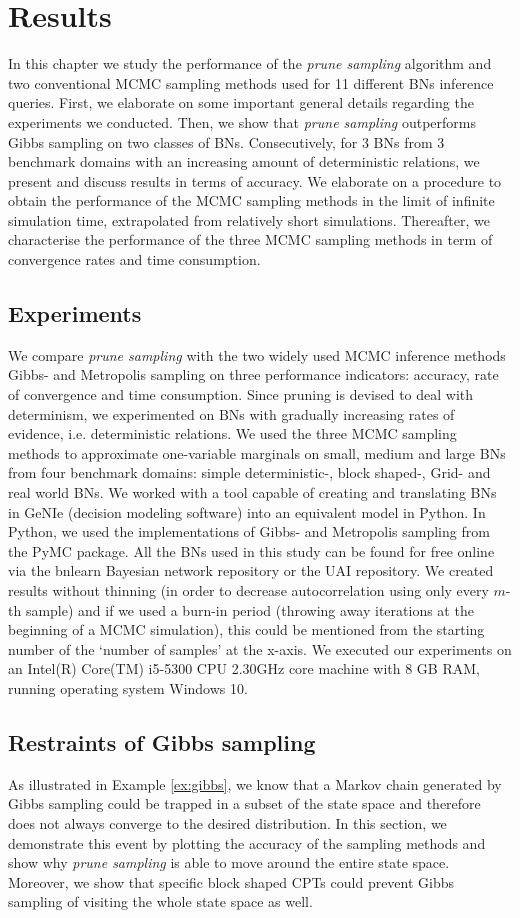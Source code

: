 \documentclass[a4paper, twoside, 11pt]{report}
\theoremstyle{plain}
\theoremstyle{definition}
\theoremstyle{remark}
\newcommand{\ps}{\textit{prune sampling }}
\begin{document}
\chapter{Results}
In this chapter we study the performance of the \ps algorithm and two conventional MCMC sampling methods used for 11 different BNs inference queries. First, we elaborate on some important general details regarding the experiments we conducted. Then, we show that \ps outperforms Gibbs sampling on two classes of BNs. Consecutively, for 3 BNs from 3 benchmark domains with an increasing amount of deterministic relations, we present and discuss results in terms of accuracy. We elaborate on a procedure to obtain the performance of the MCMC sampling methods in the limit of infinite simulation time, extrapolated from relatively short simulations. Thereafter, we characterise the performance of the three MCMC sampling methods in term of convergence rates and time consumption. 

\section{Experiments}
We compare \ps with the two widely used MCMC inference methods Gibbs- and Metropolis sampling on three performance indicators: accuracy, rate of convergence and time consumption. Since pruning is devised to deal with determinism, we experimented on BNs with gradually increasing rates of evidence, i.e. deterministic relations. We used the three MCMC sampling methods to approximate one-variable marginals on small, medium and large BNs from four benchmark domains: simple deterministic-, block shaped-, Grid- and real world BNs. We worked with a tool capable of creating and translating BNs in GeNIe (decision modeling software) into an equivalent model in Python. In Python, we used the implementations of Gibbs- and Metropolis sampling from the PyMC package. All the BNs used in this study can be found for free online via the bnlearn Bayesian network repository or the UAI repository. We created results without thinning (in order to decrease autocorrelation using only every $m$-th sample) and if we used a burn-in period (throwing away iterations at the beginning of a MCMC simulation), this could be mentioned from the starting number of the `number of samples' at the x-axis. We executed our experiments on an Intel(R) Core(TM) i5-5300 CPU 2.30GHz core machine with 8 GB RAM, running operating system Windows 10.

\section{Restraints of Gibbs sampling}
As illustrated in Example \ref{ex:gibbs}, we know that a Markov chain generated by Gibbs sampling could be trapped in a subset of the state space and therefore does not always converge to the desired distribution. In this section, we demonstrate this event by plotting the accuracy of the sampling methods and show why \ps is able to move around the entire state space. Moreover, we show that specific block shaped CPTs could prevent Gibbs sampling of visiting the whole state space as well. \\
\end{document}
